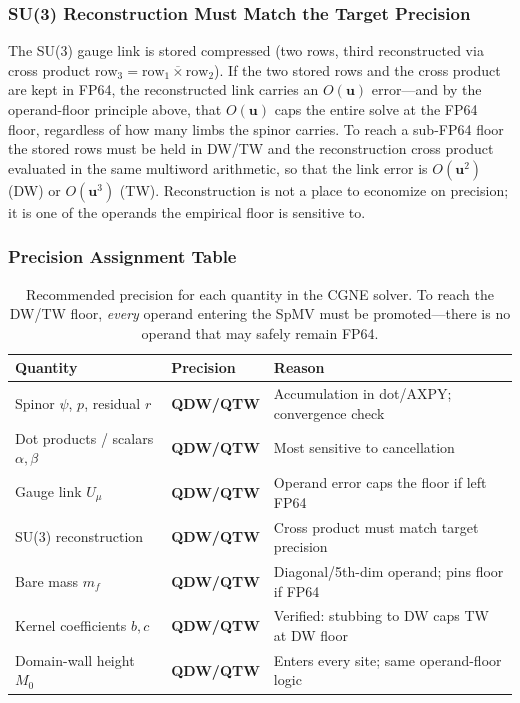 \documentclass[12pt,a4paper]{article}
\newcommand{\uu}{\mathbf{u}}
\begin{document}
\subsubsection{SU(3) Reconstruction Must Match the Target Precision}

The SU(3) gauge link is stored compressed (two rows, third reconstructed
via cross product $\text{row}_3 = \overline{\text{row}_1 \times \text{row}_2}$).
If the two stored rows and the cross product are kept in FP64, the
reconstructed link carries an $O(\uu)$ error---and by the operand-floor
principle above, that $O(\uu)$ caps the entire solve at the FP64 floor,
regardless of how many limbs the spinor carries. To reach a sub-FP64 floor the
stored rows must be held in DW/TW and the reconstruction cross product
evaluated in the same multiword arithmetic, so that the link error is $O(\uu^2)$
(DW) or $O(\uu^3)$ (TW). Reconstruction is not a place to economize on
precision; it is one of the operands the empirical floor is sensitive to.

\subsubsection{Precision Assignment Table}

\begin{table}[H]
\centering
\caption{Recommended precision for each quantity in the CGNE solver. To reach
         the DW/TW floor, \emph{every} operand entering the SpMV must be
         promoted---there is no operand that may safely remain FP64.}
\begin{tabular}{lll}
\toprule
\textbf{Quantity} & \textbf{Precision} & \textbf{Reason} \\
\midrule
Spinor $\psi$, $p$, residual $r$ & \textbf{QDW/QTW} & Accumulation in dot/AXPY; convergence check \\
Dot products / scalars $\alpha,\beta$ & \textbf{QDW/QTW} & Most sensitive to cancellation \\
Gauge link $U_\mu$    & \textbf{QDW/QTW} & Operand error caps the floor if left FP64 \\
SU(3) reconstruction  & \textbf{QDW/QTW} & Cross product must match target precision \\
Bare mass $m_f$       & \textbf{QDW/QTW} & Diagonal/5th-dim operand; pins floor if FP64 \\
Kernel coefficients $b,c$ & \textbf{QDW/QTW} & Verified: stubbing to DW caps TW at DW floor \\
Domain-wall height $M_0$  & \textbf{QDW/QTW} & Enters every site; same operand-floor logic \\
\bottomrule
\end{tabular}
\end{table}
\end{document}
